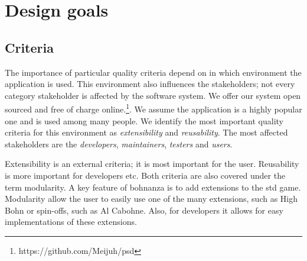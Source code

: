 \section{Design goals}
\subsection{Criteria}\label{ssec:criteria}
The importance of particular quality criteria depend on in which environment the application is
used. This environment also influences the stakeholders; not every category stakeholder is affected
by the software system. We offer our system open sourced and free of charge
online.\footnote{https://github.com/Meijuh/psd}. We assume the application is a highly popular one
and is used among many people. We identify the most important quality criteria for this
environment as \emph{extensibility} and \emph{reusability}. The most affected stakeholders are the
\emph{developers}, \emph{maintainers}, \emph{testers} and \emph{users}.

Extensibility is an external criteria; it is most important for the user. Reusability is more
important for developers etc. Both criteria are also covered under the term modularity. A key
feature of bohnanza is to add extensions to the \gls{std} game. Modularity allow the user to easily use one of the many extensions, such
as High Bohn or spin-offs, such as Al Cabohne. Also, for developers it allows for easy implementations of these extensions.  

